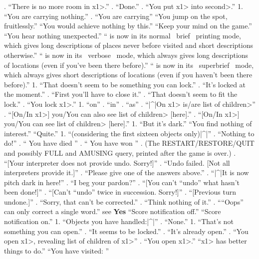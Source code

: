 {{{. ``There is no more room in \<x1>.''
. ``Done.''
. ``You put \<x1> into \<second>.''
   1. ``You are carrying nothing.''
. ``You are carrying'' 
   ``You jump on the spot, fruitlessly.''
 ``You would achieve nothing by this.''
   ``Keep your mind on the game.''
  ``You hear nothing unexpected.''
  `` is now in its normal ~brief~ printing mode, which gives
long descriptions of places never before visited and short
descriptions otherwise.''
  `` is now in its ~verbose~ mode, which always gives long
descriptions of locations (even if you've been there before).''
  `` is now in its ~superbrief~ mode, which always gives short
descriptions of locations (even if you haven't been there before).''
   1. ``That doesn't seem to be something you can lock.''
. ``It's locked at the moment.''
. ``First you'll have to close it.''
. ``That doesn't seem to fit the lock.''
. ``You lock \<x1>.''
 1. ``on''
. ``in''
. ``as'' 
. ``|^|On \<x1> is/are \<list of children>''
. ``[On/In \<x1>] you/You can also see \<list of children> [here].''
. ``[On/In \<x1>] you/You can see \<list of children> [here].''
 1. ``But it's dark.''
\N   ``You find nothing of interest.''
   ``Quite.''
 1. ``(considering the first sixteen objects only)|^|''
. ``Nothing to do!''
. `` You have died ''
. `` You have won ''
. (The RESTART/RESTORE/QUIT and possibly FULL
and AMUSING query, printed after the game is over.)
. ``[Your interpreter does not provide undo. Sorry!]''
. ``Undo failed. [Not all interpreters provide it.]''
. ``Please give one of the answers above.''
. ``|^|It is now pitch dark in here!''
. ``I beg your pardon?''
. ``[You can't ``undo'' what hasn't been done!]''
. ``[Can't ``undo'' twice in succession. Sorry!]''
. ``[Previous turn undone.]''
. ``Sorry, that can't be corrected.''
. ``Think nothing of it.''
. ````Oops'' can only correct a single word.''
    see {\bf Yes}
 ``Score notification off.''
 ``Score notification on.''
 1. ``Objects you have handled:|^|''
. ``None.''
   1. ``That's not something you can open.''
. ``It seems to be locked.''
. ``It's already open.''
. ``You open \<x1>, revealing \<list of children of x1>''
. ``You open \<x1>.''
  ``\<x1> has better things to do.''
  ``You have visited: '' 
}}}
